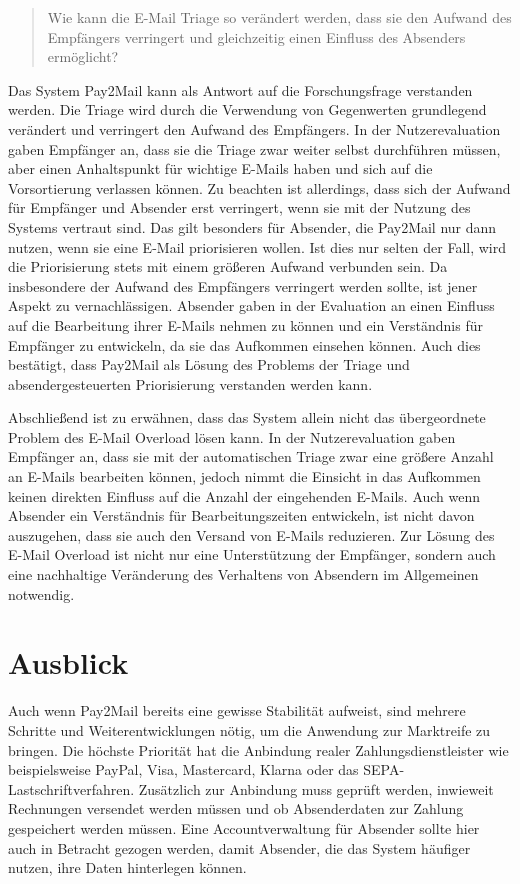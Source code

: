 \begin{quotation}
	\noindent Wie kann die E-Mail Triage so verändert werden, dass sie den Aufwand des Empfängers verringert und gleichzeitig einen Einfluss des Absenders ermöglicht?
\end{quotation}

\noindent Das System Pay2Mail kann als Antwort auf die Forschungsfrage verstanden werden. Die Triage wird durch die Verwendung von Gegenwerten grundlegend verändert und verringert den Aufwand des Empfängers. In der Nutzerevaluation gaben Empfänger an, dass sie die Triage zwar weiter selbst durchführen müssen, aber einen Anhaltspunkt für wichtige E-Mails haben und sich auf die Vorsortierung verlassen können. Zu beachten ist allerdings, dass sich der Aufwand für Empfänger und Absender erst verringert, wenn sie mit der Nutzung des Systems vertraut sind. Das gilt besonders für Absender, die Pay2Mail nur dann nutzen, wenn sie eine E-Mail priorisieren wollen. Ist dies nur selten der Fall, wird die Priorisierung stets mit einem größeren Aufwand verbunden sein. Da insbesondere der Aufwand des Empfängers verringert werden sollte, ist jener Aspekt zu vernachlässigen. Absender gaben in der Evaluation an einen Einfluss auf die Bearbeitung ihrer E-Mails nehmen zu können und ein Verständnis für Empfänger zu entwickeln, da sie das Aufkommen einsehen können. Auch dies bestätigt, dass Pay2Mail als Lösung des Problems der Triage und absendergesteuerten Priorisierung verstanden werden kann.

Abschließend ist zu erwähnen, dass das System allein nicht das übergeordnete Problem des E-Mail Overload lösen kann. In der Nutzerevaluation gaben Empfänger an, dass sie mit der automatischen Triage zwar eine größere Anzahl an E-Mails bearbeiten können, jedoch nimmt die Einsicht in das Aufkommen keinen direkten Einfluss auf die Anzahl der eingehenden E-Mails. Auch wenn Absender ein Verständnis für Bearbeitungszeiten entwickeln, ist nicht davon auszugehen, dass sie auch den Versand von E-Mails reduzieren. Zur Lösung des E-Mail Overload ist nicht nur eine Unterstützung der Empfänger, sondern auch eine nachhaltige Veränderung des Verhaltens von Absendern im Allgemeinen notwendig. 


\section{Ausblick}
\label{Ausblick}
Auch wenn Pay2Mail bereits eine gewisse Stabilität aufweist, sind mehrere Schritte und Weiterentwicklungen nötig, um die Anwendung zur Marktreife zu bringen. Die höchste Priorität hat die Anbindung realer Zahlungsdienstleister wie beispielsweise PayPal, Visa, Mastercard, Klarna oder das SEPA-Lastschriftverfahren. Zusätzlich zur Anbindung muss geprüft werden, inwieweit Rechnungen versendet werden müssen und ob Absenderdaten zur Zahlung gespeichert werden müssen. Eine Accountverwaltung für Absender sollte hier auch in Betracht gezogen werden, damit Absender, die das System häufiger nutzen, ihre Daten hinterlegen können.

